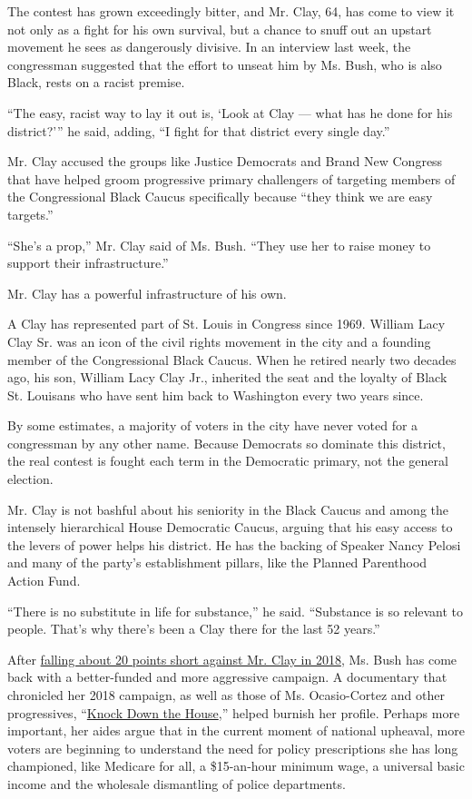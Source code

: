 The contest has grown exceedingly bitter, and Mr. Clay, 64, has come to
view it not only as a fight for his own survival, but a chance to snuff
out an upstart movement he sees as dangerously divisive. In an interview
last week, the congressman suggested that the effort to unseat him by
Ms. Bush, who is also Black, rests on a racist premise.

``The easy, racist way to lay it out is, `Look at Clay --- what has he
done for his district?''' he said, adding, ``I fight for that district
every single day.''

Mr. Clay accused the groups like Justice Democrats and Brand New
Congress that have helped groom progressive primary challengers of
targeting members of the Congressional Black Caucus specifically because
``they think we are easy targets.''

``She's a prop,'' Mr. Clay said of Ms. Bush. ``They use her to raise
money to support their infrastructure.''

Mr. Clay has a powerful infrastructure of his own.

A Clay has represented part of St. Louis in Congress since 1969. William
Lacy Clay Sr. was an icon of the civil rights movement in the city and a
founding member of the Congressional Black Caucus. When he retired
nearly two decades ago, his son, William Lacy Clay Jr., inherited the
seat and the loyalty of Black St. Louisans who have sent him back to
Washington every two years since.

By some estimates, a majority of voters in the city have never voted for
a congressman by any other name. Because Democrats so dominate this
district, the real contest is fought each term in the Democratic
primary, not the general election.

Mr. Clay is not bashful about his seniority in the Black Caucus and
among the intensely hierarchical House Democratic Caucus, arguing that
his easy access to the levers of power helps his district. He has the
backing of Speaker Nancy Pelosi and many of the party's establishment
pillars, like the Planned Parenthood Action Fund.

``There is no substitute in life for substance,'' he said. ``Substance
is so relevant to people. That's why there's been a Clay there for the
last 52 years.''

After
\href{https://www.nytimes3xbfgragh.onion/elections/results/missouri-house-district-1-primary-election}{falling
about 20 points short against Mr. Clay in 2018}, Ms. Bush has come back
with a better-funded and more aggressive campaign. A documentary that
chronicled her 2018 campaign, as well as those of Ms. Ocasio-Cortez and
other progressives,
``\href{https://www.nytimes3xbfgragh.onion/2019/04/30/movies/knock-down-the-house-review.html}{Knock
Down the House},'' helped burnish her profile. Perhaps more important,
her aides argue that in the current moment of national upheaval, more
voters are beginning to understand the need for policy prescriptions she
has long championed, like Medicare for all, a \$15-an-hour minimum wage,
a universal basic income and the wholesale dismantling of police
departments.

